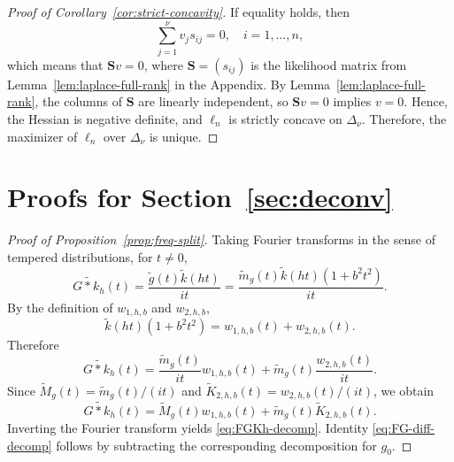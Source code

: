 \documentclass[english, 11pt]{article}
\newcommand{\FT}[1]{\widetilde{#1}}
\theoremstyle{plain}
\theoremstyle{definition}
\theoremstyle{remark}
\begin{document}
\begin{appendix}
\begin{proof}[Proof of Corollary~\ref{cor:strict-concavity}]
If equality holds, then
\begin{equation*}
\sum_{j=1}^\nu v_j s_{ij}=0,\quad i=1,\dots,n,
\end{equation*}
which means that $\mathbf S v=0$, where $\mathbf S=(s_{ij})$ is the likelihood matrix from Lemma~\ref{lem:laplace-full-rank} in the Appendix. By Lemma~\ref{lem:laplace-full-rank}, the columns of $\mathbf S$ are linearly independent, so $\mathbf S v=0$ implies $v=0$. Hence, the Hessian is negative definite, and $\ell_n$ is strictly concave on $\Delta_\nu$. Therefore, the maximizer of $\ell_n$ over $\Delta_\nu$ is unique.
\end{proof}

\section{Proofs for Section~\ref{sec:deconv}}\label{app:deconv}

\restatefrequencysplit*

\begin{proof}[Proof of Proposition~\ref{prop:freq-split}]
Taking Fourier transforms in the sense of tempered distributions, for $t\neq 0$,
\begin{equation*}
\FT{G*k_h}(t) = \frac{\FT{g}(t)\FT{k}(ht)}{it} = \frac{\FT{m}_g(t)\FT{k}(ht)(1+b^2t^2)}{it}.
\end{equation*}
By the definition of $w_{1,h,b}$ and $w_{2,h,b}$,
\begin{equation*}
\FT{k}(ht)(1+b^2t^2)=w_{1,h,b}(t)+w_{2,h,b}(t).
\end{equation*}
Therefore
\begin{equation*}
\FT{G*k_h}(t) = \frac{\FT{m}_g(t)}{it}w_{1,h,b}(t)+\FT{m}_g(t)\frac{w_{2,h,b}(t)}{it}.
\end{equation*}
Since $\FT{M}_g(t)=\FT{m}_g(t)/(it)$ and $\FT{K}_{2,h,b}(t)=w_{2,h,b}(t)/(it)$, we obtain
\begin{equation*}
\FT{G*k_h}(t) = \FT{M}_g(t) w_{1,h,b}(t)+\FT{m}_g(t) \FT{K}_{2,h,b}(t).
\end{equation*}
Inverting the Fourier transform yields \eqref{eq:FGKh-decomp}. Identity \eqref{eq:FG-diff-decomp} follows by subtracting the corresponding decomposition for $g_0$.
\end{proof}

\restatebiasbound*


\end{appendix}
\end{document}
